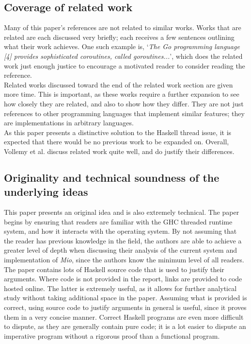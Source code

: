 \documentclass[9pt]{report}
\begin{document}
\subsection*{Coverage of related work}
Many of this paper's references are not related to similar works.
Works that are related are each discussed very briefly; each receives a few sentences outlining what their work achieves.
One such example is, `{\it The Go programming language [4] provides sophisticated coroutines, called goroutines...}', which does the related work just enough justice to encourage a motivated reader to consider reading the reference.\\

\noindent
Related works discussed toward the end of the related work section are given more time.
This is important, as these works require a further expansion to see how closely they are related, and also to show how they differ.
They are not just references to other programming languages that implement similar features; they are implementations in arbitrary languages.\\

\noindent
As this paper presents a distinctive solution to the Haskell thread issue, it is expected that there would be no previous work to be expanded on.
Overall, Vollemy et al. discuss related work quite well, and do justify their differences.

\subsection*{Originality and technical soundness of the underlying ideas}
This paper presents an original idea and is also extremely technical.
The paper begins by ensuring that readers are familiar with the GHC threaded runtime system, and how it interacts with the operating system.
By not assuming that the reader has previous knowledge in the field, the authors are able to achieve a greater level of depth when discussing their analysis of the current system and implementation of {\it Mio}, since the authors know the minimum level of all readers.\\

\noindent
The paper contains lots of Haskell source code that is used to justify their arguments.
Where code is not provided in the report, links are provided to code hosted online.
The latter is extremely useful, as it allows for further analytical study without taking additional space in the paper.
Assuming what is provided is correct, using source code to justify arguments in general is useful, since it proves them in a very concise manner.
Correct Haskell programs are even more difficult to dispute, as they are generally contain pure code; it is a lot easier to dispute an imperative program without a rigorous proof than a functional program.\\
\end{document}
